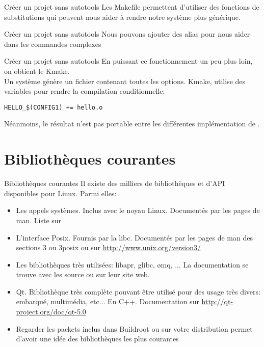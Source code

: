 \begin{frame}[fragile=singleslide]{Créer un projet sans autotools}
  Les  Makefile permettent d'utiliser  des fonctions  de substitutions
  qui  peuvent  nous aider  à  rendre  notre  système plus  générique.
  
\end{frame}

\begin{frame}[fragile=singleslide]{Créer un projet sans autotools}
  Nous pouvons  ajouter des alias  pour nous aider dans  les commandes
  complexes
  
\end{frame}


\begin{frame}[fragile=singleslide]{Créer un projet sans autotools}
  En puissant ce fonctionnement un peu plus loin, on obtient le Kmake.\\
  Un système  génère un fichier contenant toutes  les options.  Kmake,
  utilise des variables pour rendre la compilation conditionnelle:
\begin{lstlisting}
HELLO_$(CONFIG1) += hello.o
\end{lstlisting}
  Néanmoins,  le résultat  n'est  pas portable  entre les  différentes
  implémentation de .
\end{frame}

\section{Bibliothèques courantes}

\begin{frame}[fragile=singleslide]{Bibliothèques courantes}
  Il existe  des milliers de  bibliothèques et d'API  disponibles pour
  Linux. Parmi elles:
  \begin{itemize} 
  \item Les  appels systèmes. Inclus  avec le noyau  Linux. Documentés
    par les pages de man. Liste sur 
  \item L'interface  Posix.  Fournis par la libc.   Documentés par les
    pages    de   man   des    sections   3    ou   3posix    ou   sur
    \url{http://www.unix.org/version3/}
  \item Les bibliothèques très  utilisées: libapr, glibc, ømq, ...  La
    documentation se trouve avec les source ou sur leur site web.
  \item Qt.  Bibliothèque très complète pouvant être  utilisé pour des
    usage    très   divers:    embarqué,    multimédia,   etc...    En
    C++. Documentation sur \url{http://qt-project.org/doc/qt-5.0}
  \item  Regarder  les packets  inclus  dans  Buildroot  ou sur  votre
    distribution permet  d'avoir une  idée des bibliothèques  les plus
    courantes
  \end{itemize} 
\end{frame} 


